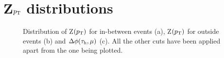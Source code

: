 \section{Z$p_\text{T}$ distributions}
\begin{figure}[H]
	\centering
	\hfill
	\hfill
	\caption{Distribution of Z$(p_\text{T})$ for in-between events (a), Z$(p_\text{T})$ for outside events (b) and $\Delta\phi(\tau_\text{h},\mu)$ (c). All the other cuts have been applied apart from the one being plotted.}
	\label{Fig21}
\end{figure}
